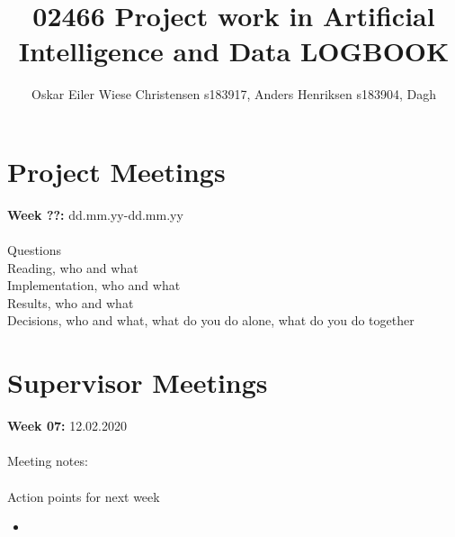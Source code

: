 \documentclass[11pt, fleqn]{article}
\title{02466 Project work in Artificial Intelligence and Data LOGBOOK}
\author{Oskar Eiler Wiese Christensen s183917, Anders Henriksen s183904, Dagh}
\begin{document}
	\maketitle
		
\section*{Project Meetings}
	
	\textbf{Week ??:}  dd.mm.yy-dd.mm.yy \\\\
	\noindent
	Questions \\
	Reading, who and what \\
	Implementation, who and what \\
	Results, who and what \\
	Decisions, who and what, what do you do alone, what do you do together
	
\section*{Supervisor Meetings}
	
	\textbf{Week 07:}  12.02.2020 \\\\
	\noindent
	Meeting notes: \\ 
	\\
	Action points for next week
	\begin{itemize}
		\item  
	\end{itemize}
	
\end{document}

